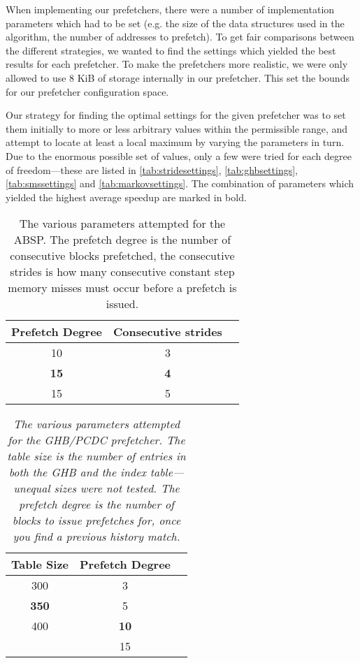 When implementing our prefetchers, there were a number of
implementation parameters which had to be set (e.g. the size of the
data structures used in the algorithm, the number of addresses to
prefetch). To get fair comparisons between the different strategies,
we wanted to find the settings which yielded the best results for each
prefetcher. To make the prefetchers more realistic, we were only
allowed to use 8 KiB of storage internally in our prefetcher. This set
the bounds for our prefetcher configuration space. 

Our strategy for finding the optimal settings for the given prefetcher
was to set them initially to more or less arbitrary values within the
permissible range, and attempt to locate at least a local maximum by
varying the parameters in turn. Due to the enormous possible set of
values, only a few were tried for each degree of freedom---these are
listed in \autoref{tab:stridesettings}, \autoref{tab:ghbsettings},
\autoref{tab:smssettings} and \autoref{tab:markovsettings}. The
combination of parameters which yielded the highest average speedup
are marked in bold.

\begin{table}[htbp]
  \caption{The various parameters attempted for the ABSP. The prefetch degree is the number of consecutive blocks prefetched, the consecutive strides is how many consecutive constant step memory misses must occur before a prefetch is issued.}
  \centering
  \begin{tabular}{|c|c|c|}
    \hline
    \textbf{Prefetch Degree} & \textbf{Consecutive strides} \\ \hline
    10 & 3 \\ \hline
    \textbf{15} & \textbf{4} \\ \hline
    15 & 5 \\ \hline %
  \end{tabular}
  \label{tab:stridesettings}
\end{table}

\begin{table}[htbp]
  \caption{\emph{The various parameters attempted for the GHB/PCDC prefetcher. The table size is the number of entries in both the GHB and the index table---unequal sizes were not tested. The prefetch degree is the number of blocks to issue prefetches for, once you find a previous history match.}}
  \centering
  \begin{tabular}{|c|c|c|}
    \hline
    \textbf{Table Size} & \textbf{Prefetch Degree} \\ \hline
    300 & 3 \\ \hline
    \textbf{350} & 5 \\ \hline
    400 & \textbf{10} \\ \hline
        & 15 \\ \hline
  \end{tabular}
  \label{tab:ghbsettings}
\end{table}


